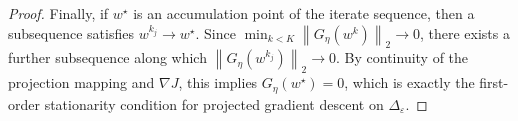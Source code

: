 \documentclass{article}
\newcommand{\simplex}{\Delta}
\newcommand{\norm}[1]{\left\lVert #1 \right\rVert}
\newcommand{\epssimplex}{\simplex_{\varepsilon}}
\begin{document}
\begin{proof}
Finally, if \(w^\star\) is an accumulation point of the iterate sequence, then a subsequence satisfies \(w^{k_j}\to w^\star\). Since \(\min_{k<K}\norm{G_\eta(w^k)}_2 \to 0\), there exists a further subsequence along which \(\norm{G_\eta(w^{k_j})}_2 \to 0\). By continuity of the projection mapping and \(\nabla J\), this implies \(G_\eta(w^\star)=0\), which is exactly the first-order stationarity condition for projected gradient descent on \(\epssimplex\). \qedhere
\end{proof}
\end{document}
